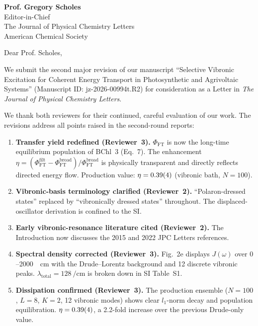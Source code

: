 \documentclass[11pt,a4paper]{letter}
\begin{document}
\begin{letter}{
\textbf{Prof. Gregory Scholes}\\
Editor-in-Chief\\
The Journal of Physical Chemistry Letters\\
American Chemical Society
}

\opening{Dear Prof. Scholes,}

We submit the second major revision of our manuscript ``Selective Vibronic Excitation for Coherent Energy Transport in Photosynthetic and Agrivoltaic Systems'' (Manuscript ID: jz-2026-00994t.R2) for consideration as a Letter in \textit{The Journal of Physical Chemistry Letters}.

We thank both reviewers for their continued, careful evaluation of our work. The revisions address all points raised in the second-round reports:

\begin{enumerate}
\item \textbf{Transfer yield redefined (Reviewer~3).} $\Phi_{\mathrm{FT}}$ is now the long-time equilibrium population of BChl~3 (Eq.~7). The enhancement $\eta = (\Phi_{\mathrm{FT}}^{\mathrm{filt}} - \Phi_{\mathrm{FT}}^{\mathrm{broad}})/\Phi_{\mathrm{FT}}^{\mathrm{broad}}$ is physically transparent and directly reflects directed energy flow. Production value: $\eta = \num{0.39 \pm 0.04}$ (vibronic bath, $N=100$).

\item \textbf{Vibronic-basis terminology clarified (Reviewer~2).} ``Polaron-dressed states'' replaced by ``vibronically dressed states'' throughout. The displaced-oscillator derivation is confined to the SI.

\item \textbf{Early vibronic-resonance literature cited (Reviewer~2).} The Introduction now discusses the 2015 and 2022 JPC Letters references.

\item \textbf{Spectral density corrected (Reviewer~3).} Fig.~2e displays $J(\omega)$ over $0$--\SI{2000}{\per\centi\meter} with the Drude--Lorentz background and \num{12} discrete vibronic peaks. $\lambda_{\mathrm{total}} = \SI{128}{\per\centi\meter}$ is broken down in SI Table~S1.

\item \textbf{Dissipation confirmed (Reviewer~3).} The production ensemble ($N=100$, $L=8$, $K=2$, 12 vibronic modes) shows clear $l_1$-norm decay and population equilibration. $\eta = \num{0.39 \pm 0.04}$, a 2.2-fold increase over the previous Drude-only value.


\end{enumerate}
\end{letter}
\end{document}
